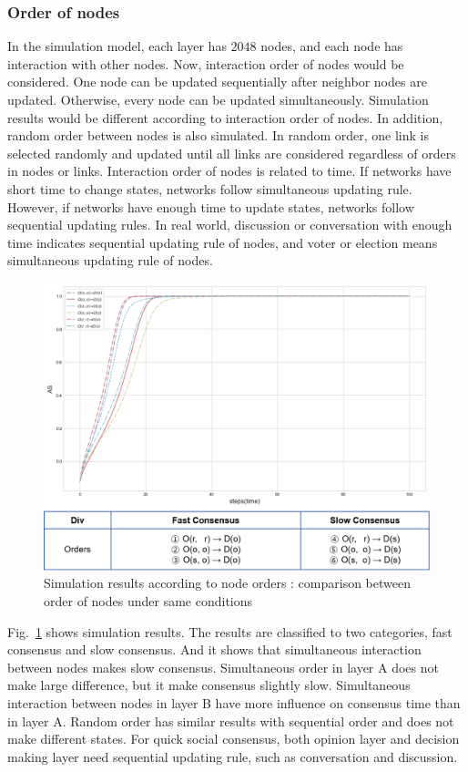 \documentclass[review]{elsarticle}
\begin{document}
\subsubsection{Order of nodes}
In the simulation model, each layer has $2048$ nodes, and each node has interaction with other nodes. Now, interaction order of nodes would be considered. One node can be updated sequentially after neighbor nodes are updated. Otherwise, every node can be updated simultaneously. Simulation results would be different according to interaction order of nodes. In addition, random order between nodes is also simulated. In random order, one link is selected randomly and updated until all links are considered regardless of orders in nodes or links. Interaction order of nodes is related to time. If networks have short time to change states, networks follow simultaneous updating rule. However, if networks have enough time to update states, networks follow sequential updating rules. In real world, discussion or conversation with enough time indicates sequential updating rule of nodes, and voter or election means simultaneous updating rule of nodes. 

\begin{figure}[!htb]
	\centering
	\includegraphics[width=\hsize]{nodeorder.png}
	\caption{Simulation results according to node orders : comparison between order of nodes under same conditions}
	\label{nodeorder}
\end{figure}
Fig.~\ref{nodeorder} shows simulation results. The results are classified to two categories, fast consensus and slow consensus. And it shows that simultaneous interaction between nodes makes slow consensus. Simultaneous order in layer A does not make large difference, but it make consensus slightly slow. Simultaneous interaction between nodes in layer B have more influence on consensus time than in layer A. Random order has similar results with sequential order and does not make different states. For quick social consensus, both opinion layer and decision making layer need sequential updating rule, such as conversation and discussion.      
\end{document}
